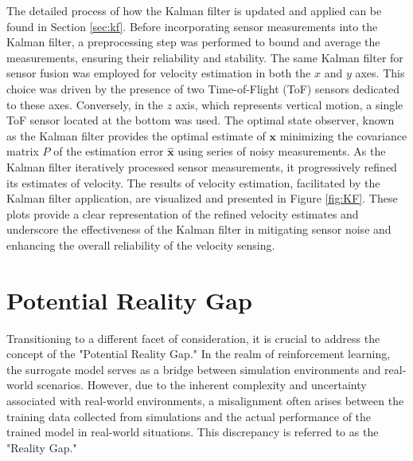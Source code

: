 The detailed process of how the Kalman filter is updated and applied can be found in Section \ref{sec:kf}. Before incorporating sensor measurements into the Kalman filter, a preprocessing step was performed to bound and average the measurements, ensuring their reliability and stability. The same Kalman filter for sensor fusion was employed for velocity estimation in both the $x$ and $y$ axes. This choice was driven by the presence of two Time-of-Flight (ToF) sensors dedicated to these axes. Conversely, in the $z$ axis, which represents vertical motion, a single ToF sensor located at the bottom was used. The optimal state observer, known as the Kalman filter provides the optimal estimate of $\mathbf{x}$ minimizing the covariance matrix $P$ of the estimation error $\hat{\mathbf{x}}$ using series of noisy measurements. As the Kalman filter iteratively processed sensor measurements, it progressively refined its estimates of velocity. The results of velocity estimation, facilitated by the Kalman filter application, are visualized and presented in Figure \ref{fig:KF}. These plots provide a clear representation of the refined velocity estimates and underscore the effectiveness of the Kalman filter in mitigating sensor noise and enhancing the overall reliability of the velocity sensing.

\section{Potential Reality Gap}
Transitioning to a different facet of consideration, it is crucial to address the concept of the "Potential Reality Gap." In the realm of reinforcement learning, the surrogate model serves as a bridge between simulation environments and real-world scenarios. However, due to the inherent complexity and uncertainty associated with real-world environments, a misalignment often arises between the training data collected from simulations and the actual performance of the trained model in real-world situations. This discrepancy is referred to as the "Reality Gap."

